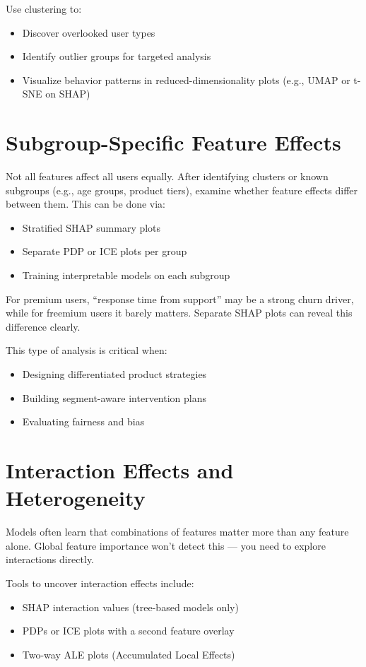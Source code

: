 \documentclass[12pt,openany]{book}
\begin{document}
Use clustering to:
\begin{itemize}
  \item Discover overlooked user types
  \item Identify outlier groups for targeted analysis
  \item Visualize behavior patterns in reduced-dimensionality plots (e.g., UMAP or t-SNE on SHAP)
\end{itemize}

\section{Subgroup-Specific Feature Effects}

Not all features affect all users equally. After identifying clusters or known subgroups (e.g., age groups, product tiers), examine whether feature effects differ between them. This can be done via:
\begin{itemize}
  \item Stratified SHAP summary plots
  \item Separate PDP or ICE plots per group
  \item Training interpretable models on each subgroup
\end{itemize}

\begin{examplebox}
For premium users, ``response time from support'' may be a strong churn driver, while for freemium users it barely matters. Separate SHAP plots can reveal this difference clearly.
\end{examplebox}

This type of analysis is critical when:
\begin{itemize}
  \item Designing differentiated product strategies
  \item Building segment-aware intervention plans
  \item Evaluating fairness and bias
\end{itemize}

\section{Interaction Effects and Heterogeneity}

Models often learn that combinations of features matter more than any feature alone. Global feature importance won’t detect this — you need to explore interactions directly.

Tools to uncover interaction effects include:
\begin{itemize}
  \item SHAP interaction values (tree-based models only)
  \item PDPs or ICE plots with a second feature overlay
  \item Two-way ALE plots (Accumulated Local Effects)
\end{itemize}
\end{document}
